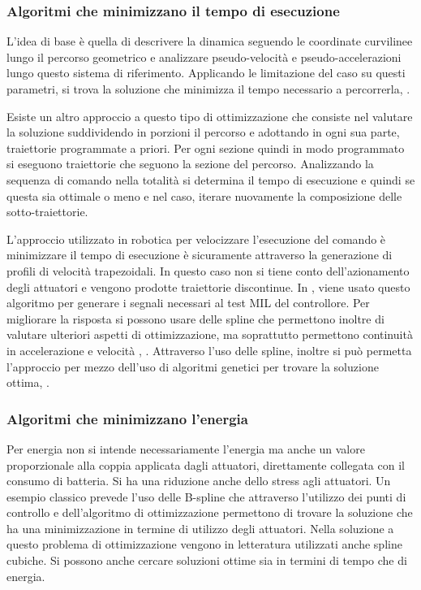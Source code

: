 \subsubsection{Algoritmi che minimizzano il tempo di esecuzione}

L'idea di base è quella di descrivere la dinamica seguendo le coordinate curvilinee lungo il percorso geometrico e analizzare pseudo-velocità e pseudo-accelerazioni lungo questo sistema di riferimento. Applicando le limitazione del caso su questi parametri, si trova la soluzione che minimizza il tempo necessario a percorrerla, \cite{PathPlannigOverview}. 

Esiste un altro approccio a questo tipo di ottimizzazione che consiste nel valutare la soluzione suddividendo in porzioni il percorso e adottando in ogni sua parte, traiettorie programmate a priori. Per ogni sezione quindi in modo programmato si eseguono traiettorie che seguono la sezione del percorso. Analizzando la sequenza di comando nella totalità si determina il tempo di esecuzione e quindi se questa sia ottimale o meno e nel caso, iterare nuovamente la composizione delle sotto-traiettorie. 

L'approccio utilizzato in robotica per velocizzare l'esecuzione del comando è minimizzare il tempo di esecuzione è sicuramente attraverso la generazione di profili di velocità trapezoidali. In questo caso non si tiene conto dell'azionamento degli attuatori e vengono prodotte traiettorie discontinue. In \cite{DesTestCarm}, viene usato questo algoritmo per generare i segnali necessari al test MIL del controllore.
Per migliorare la risposta si possono usare delle spline che permettono inoltre di valutare ulteriori aspetti di ottimizzazione, ma soprattutto permettono continuità in accelerazione e velocità , \cite{baseTesi}.
Attraverso l'uso delle spline, inoltre si può permetta l'approccio per mezzo dell'uso di algoritmi genetici per trovare la soluzione ottima, \cite{PathPlannigOverview}.

\subsubsection{Algoritmi che minimizzano l'energia}
Per energia non si intende necessariamente l'energia ma anche un valore proporzionale alla coppia applicata dagli attuatori, direttamente collegata con il consumo di batteria. Si ha una riduzione anche dello stress agli attuatori. Un esempio classico prevede l'uso delle B-spline che attraverso l'utilizzo dei punti di controllo e dell'algoritmo di ottimizzazione permettono di trovare la soluzione che ha una minimizzazione in termine di utilizzo degli attuatori. Nella soluzione a questo problema di ottimizzazione vengono in letteratura utilizzati anche spline cubiche. Si possono anche cercare soluzioni ottime sia in termini di tempo che di energia.


